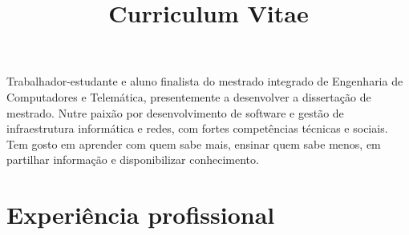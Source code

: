 \documentclass[11pt,a4paper,sans]{moderncv} %
\title{Curriculum Vitae}                               %
\begin{document}
\makecvtitle

\small{Trabalhador-estudante e aluno finalista do mestrado integrado de
  Engenharia de Computadores e Telemática, presentemente a desenvolver a
  dissertação de mestrado. Nutre paixão por desenvolvimento de software e
  gestão de infraestrutura informática e redes, com fortes competências técnicas
  e sociais. Tem gosto em aprender com quem sabe mais, ensinar quem sabe menos,
  em partilhar informação e disponibilizar conhecimento.}

\section{Experiência profissional}

\vspace{6pt}
\end{document}
